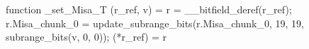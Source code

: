 function _set_Misa_T (r_ref, v) = {
    r = __bitfield_deref(r_ref);
    r.Misa_chunk_0 = update_subrange_bits(r.Misa_chunk_0, 19, 19, subrange_bits(v, 0, 0));
    (*r_ref) = r
}
